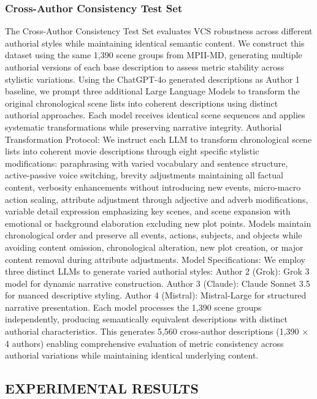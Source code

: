 \documentclass[main.tex]{subfiles}
\begin{document}
\subsubsection{Cross-Author Consistency Test Set}
The Cross-Author Consistency Test Set evaluates VCS robustness across different authorial styles while maintaining identical semantic content. We construct this dataset using the same 1,390 scene groups from MPII-MD, generating multiple authorial versions of each base description to assess metric stability across stylistic variations. Using the ChatGPT-4o generated descriptions as Author 1 baseline, we prompt three additional Large Language Models to transform the original chronological scene lists into coherent descriptions using distinct authorial approaches. Each model receives identical scene sequences and applies systematic transformations while preserving narrative integrity. Authorial Transformation Protocol: We instruct each LLM to transform chronological scene lists into coherent movie descriptions through eight specific stylistic modifications: paraphrasing with varied vocabulary and sentence structure, active-passive voice switching, brevity adjustments maintaining all factual content, verbosity enhancements without introducing new events, micro-macro action scaling, attribute adjustment through adjective and adverb modifications, variable detail expression emphasizing key scenes, and scene expansion with emotional or background elaboration excluding new plot points. Models maintain chronological order and preserve all events, actions, subjects, and objects while avoiding content omission, chronological alteration, new plot creation, or major content removal during attribute adjustments. Model Specifications: We employ three distinct LLMs to generate varied authorial styles: Author 2 (Grok): Grok 3 model for dynamic narrative construction. Author 3 (Claude): Claude Sonnet 3.5 for nuanced descriptive styling. Author 4 (Mistral): Mistral-Large for structured narrative presentation. Each model processes the 1,390 scene groups independently, producing semantically equivalent descriptions with distinct authorial characteristics. This generates 5,560 cross-author descriptions (1,390 × 4 authors) enabling comprehensive evaluation of metric consistency across authorial variations while maintaining identical underlying content.

\subsection{EXPERIMENTAL RESULTS}
\end{document}
